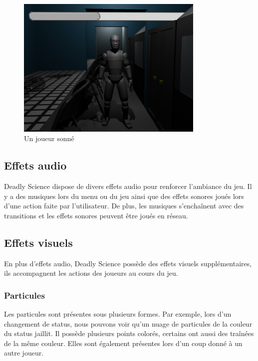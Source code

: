 \documentclass{article}
\begin{document}
\begin{figure}[H]
    \centering
    \includegraphics[width=0.8\textwidth]{cc/stamina_stunned.png}
    \caption{Un joueur sonné}
    \label{cc_b}
\end{figure}

\subsection{Effets audio}

Deadly Science dispose de divers effets audio pour renforcer l'ambiance du jeu.
Il y a des musiques lors du menu ou du jeu ainsi que des effets sonores joués lors d'une action faite par l'utilisateur. 
De plus, les musiques s'enchaînent avec des transitions et les effets sonores peuvent être joués en réseau.

\subsection{Effets visuels}

En plus d'effets audio, Deadly Science possède des effets visuels supplémentaires, ils accompagnent les actions des joueurs au cours du jeu.

\subsubsection{Particules}

Les particules sont présentes sous plusieurs formes.
Par exemple, lors d'un changement de status, nous pouvons voir qu'un nuage de particules de la couleur du status jaillit. Il possède plusieurs points colorés, certains ont aussi des traînées de la même couleur.
Elles sont également présentes lors d'un coup donné à un autre joueur.
\end{document}
